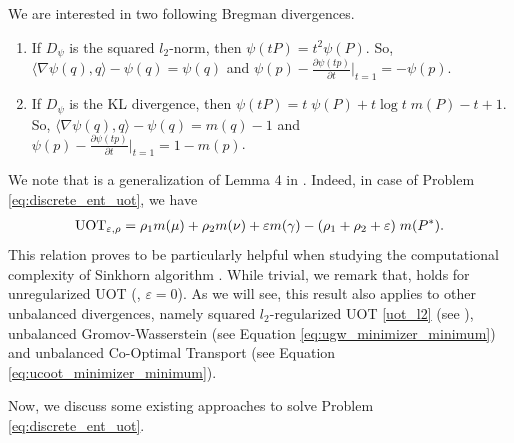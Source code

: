 We are interested in two following Bregman divergences.
\begin{enumerate}
  \item If $D_{\psi}$ is the squared $l_2$-norm, then $\psi(tP) = t^2 \psi(P)$. So,
  $\langle \nabla \psi(q), q \rangle - \psi(q) = \psi(q)$ and
  $\psi(p) - \frac{\partial \psi(tp)}{\partial t} \Big|_{t=1} = -\psi(p)$.

  \item If $D_{\psi}$ is the KL divergence, then
  $\psi(tP) = t \; \psi(P) + t \log t \; m(P) - t + 1$.
  So, $\langle \nabla \psi(q), q \rangle - \psi(q) = m(q) - 1$ and
  $\psi(p) - \frac{\partial \psi(tp)}{\partial t} \Big|_{t=1} = 1 - m(p)$.
\end{enumerate}
We note that  is a generalization of Lemma 4 in \citep{Khiem20}.
Indeed, in case of Problem \eqref{eq:discrete_ent_uot}, we have
\begin{align}
  \text{UOT}_{\varepsilon, \rho} = \rho_1 m(\mu) + \rho_2 m(\nu) + \varepsilon m(\gamma)
  - (\rho_1 + \rho_2 + \varepsilon) \; m(P^*).
\end{align}
This relation proves to be particularly helpful when studying the computational complexity of
Sinkhorn algorithm \citep{Khiem20}.
While trivial, we remark that,  holds for unregularized UOT
(\ie, $\varepsilon = 0$). As we will see, this result also applies to other unbalanced divergences,
namely squared $l_2$-regularized UOT \eqref{uot_l2} (see ),
unbalanced Gromov-Wasserstein (see Equation \eqref{eq:ugw_minimizer_minimum})
and unbalanced Co-Optimal Transport (see Equation \eqref{eq:ucoot_minimizer_minimum}).

Now, we discuss some existing approaches to solve Problem \eqref{eq:discrete_ent_uot}.

